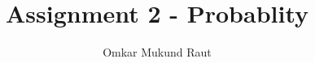 \documentclass[journal,12pt,twocolumn]{IEEEtran}
\begin{document}
\makeatletter
{}
\makeatother

\let\StandardTheFigure\thefigure
\let\vec\mathbf
\let\j\jmath
\renewcommand{\thefigure}{\theproblem}



\def\putbox#1#2#3{\makebox[0in][l]{\makebox[#1][l]{}\raisebox{\baselineskip}[0in][0in]{\raisebox{#2}[0in][0in]{#3}}}}
     \def\rightbox#1{\makebox[0in][r]{#1}}
     \def\centbox#1{\makebox[0in]{#1}}
     \def\topbox#1{\raisebox{-\baselineskip}[0in][0in]{#1}}
     \def\midbox#1{\raisebox{-0.5\baselineskip}[0in][0in]{#1}}

\vspace{3cm}

\title{
	Assignment 2 - Probablity
}


%
%
%

\author{
	Omkar Mukund Raut
}
% 
%
\end{document}
